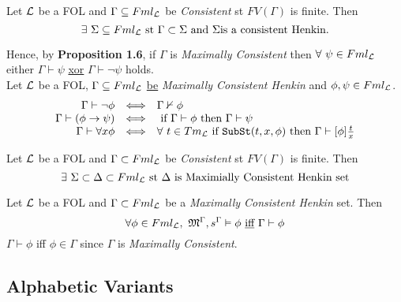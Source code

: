 \documentclass[11pt,a4paper]{article}
\begin{document}

\theorem{}
Let $\mathcal{L}$ be a FOL and $\Gamma\subseteq Fml_{\mathcal{L}}$ be \textit{Consistent} st $FV(\Gamma)$ is finite. Then
\[\exists\ \Sigma\subseteq Fml_{\mathcal{L}}\text{ st }\Gamma\subset\Sigma\text{ and }\Sigma\text{is a consistent Henkin}.\]



Hence, by \textbf{Proposition 1.6}, if $\Gamma$ is \textit{Maximally Consistent} then $\forall\ \psi\in Fml_{\mathcal{L}}$ either $\Gamma\vdash\psi$ \underline{xor} $\Gamma\vdash\neg\psi$ holds.\\

Let $\mathcal{L}$ be a FOL, $\Gamma\subseteq Fml_{\mathcal{L}}$ \underline{be} \textit{Maximally Consistent Henkin} and $\phi,\psi\in Fml_{\mathcal{L}}$.
\[\begin{array}{rcl}
\Gamma\vdash\neg\phi&\Longleftrightarrow&\Gamma\nvdash\phi\\
\Gamma\vdash(\phi\to\psi)&\Longleftrightarrow&\text{ if }\Gamma\vdash\phi\text{ then }\Gamma\vdash\psi\\
\Gamma\vdash\forall x\phi&\Longleftrightarrow&\forall\ t\in Tm_{\mathcal{L}}\text{ if }\texttt{SubSt}(t,x,\phi)\text{ then }\Gamma\vdash[\phi]\frac{t}x
\end{array}\]

\proposition{}
Let $\mathcal{L}$ be a FOL and $\Gamma\subset Fml_{\mathcal{L}}$ be \textit{Consistent} st $FV(\Gamma)$ is finite. Then
\[\exists\ \Sigma\subset\Delta\subset Fml_\LL\text{ st }\Delta\text{ is Maximially Consistent Henkin set}\]

Let $\mathcal{L}$ be a FOL and $\Gamma\subset Fml_{\mathcal{L}}$ be a \textit{Maximally Consistent Henkin} set. Then
\[\forall\phi\in Fml_\LL,\ \M^\Gamma,s^\Gamma\vDash\phi\text{ \underline{iff} }\Gamma\vdash\phi\]
\nb $\Gamma\vdash\phi$ iff $\phi\in\Gamma$ since $\Gamma$ is \textit{Maximally Consistent}.

\subsection{Alphabetic Variants}
\end{document}
